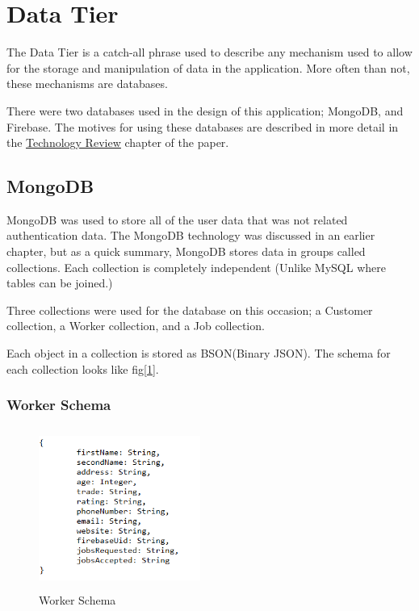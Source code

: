 \section{Data Tier}
\label{sec:SystemDesignDataTier}

\bigskip

The Data Tier is a catch-all phrase used to describe any mechanism used to allow for the storage and manipulation of data in the application. More often than not, these mechanisms are databases. 

There were two databases used in the design of this application; MongoDB, and Firebase.
The motives for using these databases are described in more detail in the \hyperref[sec:TechnologyReview]{\underline{Technology Review}} chapter of the paper.


\subsection{MongoDB}
\label{sec:SystemDesignMongoDB}

\bigskip

MongoDB was used to store all of the user data that was not related authentication data. The MongoDB technology was discussed in an earlier chapter, but as a quick summary, MongoDB stores data in groups called collections. Each collection is completely independent (Unlike MySQL where tables can be joined.) 

\bigskip

Three collections were used for the database on this occasion; a Customer collection, a Worker collection, and a Job collection. 

Each object in a collection is stored as BSON(Binary JSON). The schema for each collection looks like fig[\ref{fig:workerSchema}]. 

\subsubsection{Worker Schema}
\label{sec:SystemDesignWorkerSchema}

\begin{figure}[H]
    \centering
    \includegraphics[width=150pt, height=150pt]{DesignImages/WorkerSchema.PNG}
    \caption{Worker Schema}
    \label{fig:workerSchema}
\end{figure}

